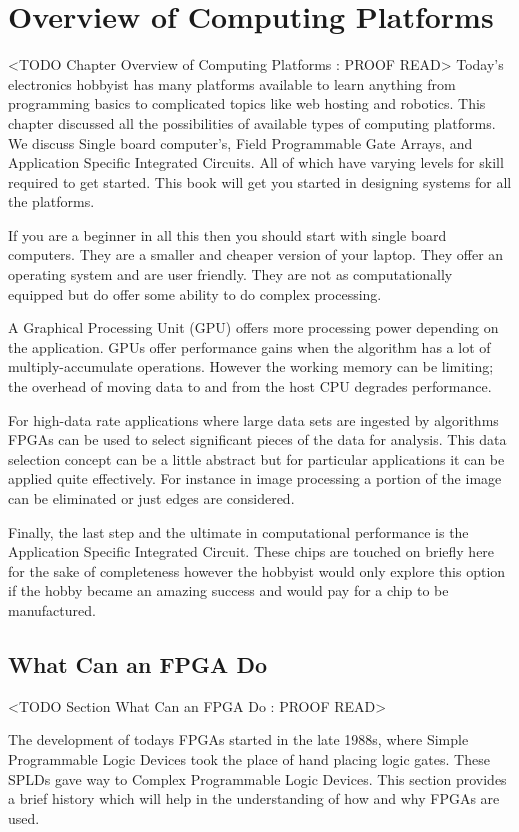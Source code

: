 \chapter{Overview of Computing Platforms}
	<TODO Chapter Overview of Computing Platforms : PROOF READ>
Today's electronics hobbyist has many platforms available to learn anything from programming basics to complicated topics like web hosting and robotics. This chapter discussed all the possibilities of available types of computing platforms. We discuss Single board computer's, Field Programmable Gate Arrays, and Application Specific Integrated Circuits. All of which have varying levels for skill required to get started. This book will get you started in designing systems for all the platforms.  

If you are a beginner in all this then you should start with single board computers. They are a smaller and cheaper version of your laptop. They offer an operating system and are user friendly. They are not as computationally equipped but do offer some ability to do complex processing. 

A Graphical Processing Unit (GPU) offers more processing power depending on the application. GPUs offer performance gains when the algorithm has a lot of multiply-accumulate operations. However the working memory can be limiting; the overhead of moving data to and from the host CPU degrades performance.

For high-data rate applications where large data sets are ingested by algorithms FPGAs can be used to select significant pieces of the data for analysis. This data selection concept can be a little abstract but for particular applications it can be applied quite effectively. For instance in image processing a portion of the image can be eliminated or just edges are considered. 

Finally, the last step and the ultimate in computational performance is the Application Specific Integrated Circuit. These chips are touched on briefly here for the sake of completeness however the hobbyist would only explore this option if the hobby became an amazing success and would pay for a chip to be manufactured. 
	
	
\section{What Can an FPGA Do}
	<TODO Section What Can an FPGA Do : PROOF READ>

The development of todays FPGAs started in the late 1988s, where Simple Programmable Logic Devices took the place of hand placing logic gates. These SPLDs gave way to Complex Programmable Logic Devices. This section provides a brief history which will help in the understanding of how and why FPGAs are used.  	
	

